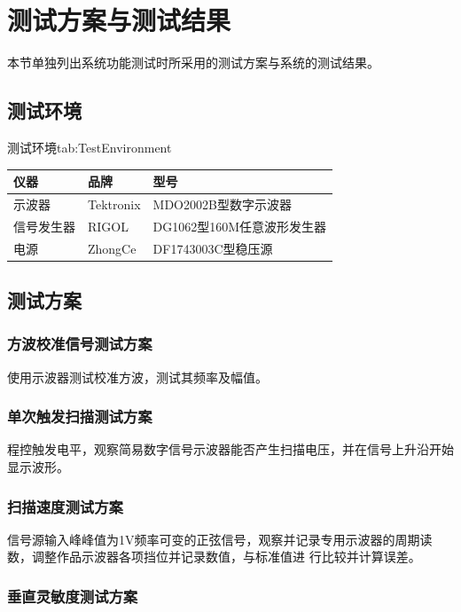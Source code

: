 \documentclass[supercite]{HustGraduPaper}
\begin{document}
	
	\section{测试方案与测试结果}
	
	本节单独列出系统功能测试时所采用的测试方案与系统的测试结果。
	
	\subsection{测试环境}
	\begin{generaltab}{测试环境}{tab:TestEnvironment}
		\begin{tabularx}{10cm}{lll}
			\toprule
			仪器 & 品牌 & 型号      \\
			\midrule
			示波器                   & Tektronix              & MDO2002B型数字示波器        \\
			信号发生器                 & RIGOL                  & DG1062型160M任意波形发生器    \\
			电源                    & ZhongCe                & DF1743003C型稳压源        \\
			\bottomrule
		\end{tabularx}
	\end{generaltab}
	
	\subsection{测试方案}
	
	\subsubsection{方波校准信号测试方案}
	使用示波器测试校准方波，测试其频率及幅值。
	
	\subsubsection{单次触发扫描测试方案}
	程控触发电平，观察简易数字信号示波器能否产生扫描电压，并在信号上升沿开始显示波形。
	
	
	\subsubsection{扫描速度测试方案}
	信号源输入峰峰值为1V频率可变的正弦信号，观察并记录专用示波器的周期读数，调整作品示波器各项挡位并记录数值，与标准值进
	行比较并计算误差。
	
	
	\subsubsection{垂直灵敏度测试方案}
	
\end{document}
